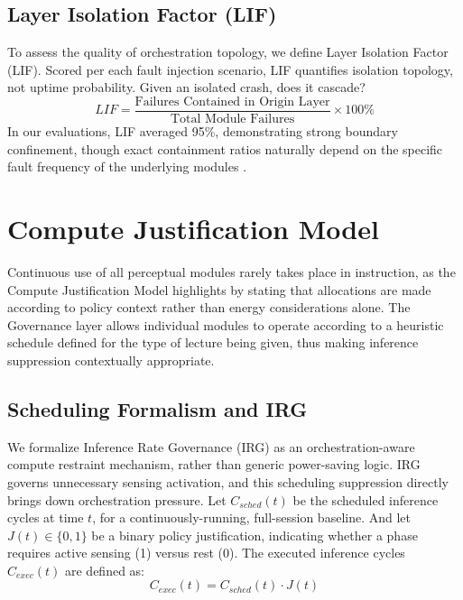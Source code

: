 \documentclass[conference]{IEEEtran}
\begin{document}
\subsection{Layer Isolation Factor (LIF)}
To assess the quality of orchestration topology, we define Layer Isolation Factor (LIF). Scored per each fault injection scenario, LIF quantifies isolation topology, not uptime probability. Given an isolated crash, does it cascade?
\begin{equation}
LIF = \frac{\text{Failures Contained in Origin Layer}}{\text{Total Module Failures}} \times 100\%
\end{equation}
In our evaluations, LIF averaged 95\%, demonstrating strong boundary confinement, though exact containment ratios naturally depend on the specific fault frequency of the underlying modules \cite{b18}.

\section{Compute Justification Model}

Continuous use of all perceptual modules rarely takes place in instruction, as the Compute Justification Model highlights by stating that allocations are made according to policy context rather than energy considerations alone. The Governance layer allows individual modules to operate according to a heuristic schedule defined for the type of lecture being given, thus making inference suppression contextually appropriate.

\subsection{Scheduling Formalism and IRG}
We formalize Inference Rate Governance (IRG) as an orchestration-aware compute restraint mechanism, rather than generic power-saving logic. IRG governs unnecessary sensing activation, and this scheduling suppression directly brings down orchestration pressure. Let $C_{sched}(t)$ be the scheduled inference cycles at time $t$, for a continuously-running, full-session baseline. And let $J(t) \in \{0,1\}$ be a binary policy justification, indicating whether a phase requires active sensing (1) versus rest (0). The executed inference cycles $C_{exec}(t)$ are defined as:
\begin{equation}
C_{exec}(t) = C_{sched}(t) \cdot J(t)
\end{equation}
\end{document}

